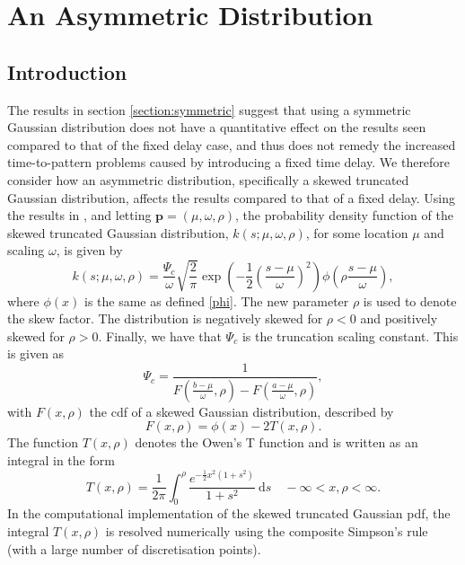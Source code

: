 \section{An Asymmetric Distribution}
\subsection{Introduction}
The results in section \ref{section:symmetric} suggest that using a symmetric Gaussian distribution does not have a quantitative effect on the results seen compared to that of the fixed delay case, and thus does not remedy the increased time-to-pattern problems caused by introducing a fixed time delay. We therefore consider how an asymmetric distribution, specifically a skewed truncated Gaussian distribution, affects the results compared to that of a fixed delay. Using the results in \cite{skewed}, and letting $\textbf{p}=(\mu,\omega,\rho)$, the probability density function of the skewed truncated Gaussian distribution, $k(s;\mu,\omega,\rho)$, for some location $\mu$ and scaling $\omega$, is given by
\begin{equation}
    k(s;\mu,\omega,\rho)=\frac{\Psi_c}{\omega}\sqrt{\frac{2}{\pi}}\exp\left(-\frac{1}{2}\left(\frac{s-\mu}{\omega}\right)^2\right)\phi\left(\rho\frac{s-\mu}{\omega}\right),
\end{equation}
where $\phi(x)$ is the same as defined \eqref{phi}. The new parameter $\rho$ is used to denote the skew factor. The distribution is negatively skewed for $\rho<0$ and positively skewed for $\rho>0$. Finally, we have that $\Psi_c$ is the truncation scaling constant. This is given as
\begin{equation}
    \Psi_c=\frac{1}{F\left(\frac{b-\mu}{\omega},\rho\right)-F\left(\frac{a-\mu}{\omega},\rho\right)},
\end{equation}
with $F(x,\rho)$ the cdf of a skewed Gaussian distribution, described by
\begin{equation}
    F(x,\rho)=\phi(x)-2T(x,\rho).
\end{equation}
The function $T(x,\rho)$ denotes the Owen's T function \cite{owenst} and is written as an integral in the form
\begin{equation}
    T(x,\rho)=\frac{1}{2\pi}\int_0^\rho\frac{e^{-\frac{1}{2}x^2(1+s^2)}}{1+s^2}\ \text{d}s\quad -\infty<x,\rho<\infty.
\end{equation}
In the computational implementation of the skewed truncated Gaussian pdf, the integral $T(x,\rho)$ is resolved numerically using the composite Simpson's rule (with a large number of discretisation points).

